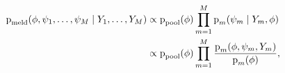 \begin{align}
  \text{p}_{\text{meld}}(\phi, \psi_{1}, \ldots, \psi_{M} \mid Y_{1}, \ldots,  Y_{M}) &\propto
    \text{p}_{\text{pool}}(\phi)
    \prod_{m = 1}^{M}
    \text{p}_{m}(\psi_{m} \mid Y_{m}, \phi) \\
    &\propto \text{p}_{\text{pool}}(\phi)
    \prod_{m = 1}^{M}
    \frac {
      \text{p}_{m}(\phi, \psi_{m}, Y_{m})
    } {
      \text{p}_{m}(\phi)
    },
  \label{eqn:melding-factorisation}
\end{align}